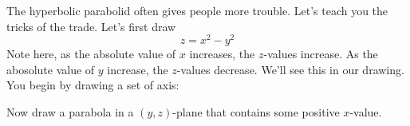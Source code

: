 \documentclass{ximera}
\begin{document}
The hyperbolic parabolid often gives people more trouble. Let's teach
you the tricks of the trade. Let's first draw
\[
z = x^2-y^2
\]
Note here, as the absolute value of $x$ increases, the $z$-values
increase. As the abosolute value of $y$ increase, the $z$-values
decrease. We'll see this in our drawing. You begin by drawing a set of
axis:
\begin{image}
\end{image}
Now draw a parabola in a $(y,z)$-plane that contains some positive $x$-value.
\end{document}
